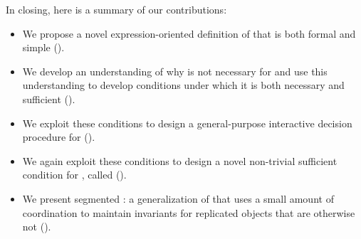 In closing, here is a summary of our contributions:
\begin{itemize}
  \item
    We propose a novel expression-oriented definition of \invariantconfluence{}
    that is both formal and simple ().
  \item
    We develop an understanding of why \invariantclosure{} is not necessary for
    \invariantconfluence{} and use this understanding to develop conditions
    under which it is both necessary and sufficient
    ().
  \item
    We exploit these conditions to design a general-purpose interactive
    decision procedure for \invariantconfluence{}
    ().
  \item
    We again exploit these conditions to design a novel non-trivial sufficient
    condition for \invariantconfluence{}, called \mergereducibility{}
    ().
  \item
    We present segmented \invariantconfluence{}: a generalization of
    \invariantconfluence{} that uses a small amount of coordination to maintain
    invariants for replicated objects that are otherwise not
    \invariantconfluent{} ().

\end{itemize}
